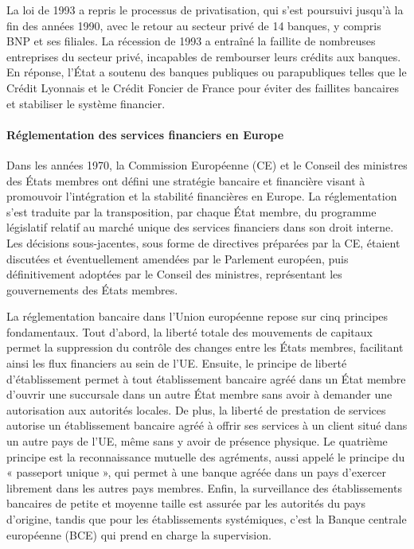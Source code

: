 \documentclass[a4paper, 12pt]{report}
\begin{document}
La loi de 1993 a repris le processus de privatisation, qui s'est poursuivi jusqu'à la fin des années 1990, avec le retour au secteur privé de 14 banques, y compris BNP et ses filiales. La récession de 1993 a entraîné la faillite de nombreuses entreprises du secteur privé, incapables de rembourser leurs crédits aux banques. En réponse, l'État a soutenu des banques publiques ou parapubliques telles que le Crédit Lyonnais et le Crédit Foncier de France pour éviter des faillites bancaires et stabiliser le système financier.

\paragraph{Réglementation des services financiers en Europe}

Dans les années 1970, la Commission Européenne (CE) et le Conseil des ministres des États membres ont défini une stratégie bancaire et financière visant à promouvoir l'intégration et la stabilité financières en Europe. La réglementation s'est traduite par la transposition, par chaque État membre, du programme législatif relatif au marché unique des services financiers dans son droit interne. Les décisions sous-jacentes, sous forme de directives préparées par la CE, étaient discutées et éventuellement amendées par le Parlement européen, puis définitivement adoptées par le Conseil des ministres, représentant les gouvernements des États membres.

La réglementation bancaire dans l'Union européenne repose sur cinq principes fondamentaux. Tout d'abord, la liberté totale des mouvements de capitaux permet la suppression du contrôle des changes entre les États membres, facilitant ainsi les flux financiers au sein de l'UE. Ensuite, le principe de liberté d’établissement permet à tout établissement bancaire agréé dans un État membre d’ouvrir une succursale dans un autre État membre sans avoir à demander une autorisation aux autorités locales. De plus, la liberté de prestation de services autorise un établissement bancaire agréé à offrir ses services à un client situé dans un autre pays de l’UE, même sans y avoir de présence physique. Le quatrième principe est la reconnaissance mutuelle des agréments, aussi appelé le principe du « passeport unique », qui permet à une banque agréée dans un pays d’exercer librement dans les autres pays membres. Enfin, la surveillance des établissements bancaires de petite et moyenne taille est assurée par les autorités du pays d’origine, tandis que pour les établissements systémiques, c'est la Banque centrale européenne (BCE) qui prend en charge la supervision.
\end{document}
